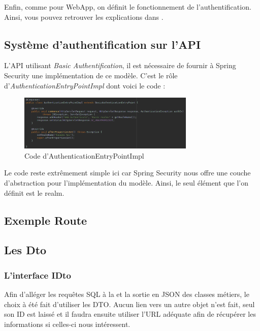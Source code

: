 			Enfin, comme pour WebApp, on définit le fonctionnement de l'authentification. Ainsi, vous pouvez retrouver les explications dans .

		\subsection{Système d'authentification sur l'API}
			\label{subsec:basic_auth}

			L'API utilisant \textit{Basic Authentification}, il est nécessaire de fournir à Spring Security une implémentation de ce modèle. C'est le rôle d'\textit{AuthenticationEntryPointImpl} dont voici le code :

			\begin{figure}[H]
				\centering\includegraphics[width=0.75\textwidth, keepaspectratio]{res/AuthenticationEntryPointImpl.png}
				\caption{Code d'AuthenticationEntryPointImpl}
			\end{figure}

			Le code reste extrêmement simple ici car Spring Security nous offre une couche d'abstraction pour l'implémentation du modèle. Ainsi, le seul élément que l'on définit est le realm.

		\subsection{Exemple Route}


		\subsection{Les Dto}

			\subsubsection{L'interface IDto}

				Afin d'alléger les requêtes SQL à la \bdd{} et la sortie en JSON des classes métiers, le choix à été fait d'utiliser les DTO. Aucun lien vers un autre objet n'est fait, seul son ID est laissé et il faudra ensuite utiliser l'URL adéquate afin de récupérer les informations si celles-ci nous intéressent.

